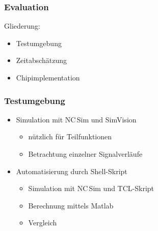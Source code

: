 \begin{frame}\frametitle{Evaluation}
Gliederung:
 \begin{itemize}
  \item Testumgebung
  \item Zeitabschätzung
  \item Chipimplementation
 \end{itemize}

\end{frame}


\begin{frame}\frametitle{Testumgebung}
 \begin{itemize}
  \item Simulation mit NC\,Sim und SimVision
  \begin{itemize}
   \item nützlich für Teilfunktionen
   \item Betrachtung einzelner Signalverläufe
  \end{itemize}
  \item Automatisierung durch Shell-Skript
  \begin{itemize}
   \item Simulation mit NC\,Sim und TCL-Skript
   \item Berechnung mittels Matlab
   \item Vergleich
  \end{itemize}
 \end{itemize}
\end{frame}



